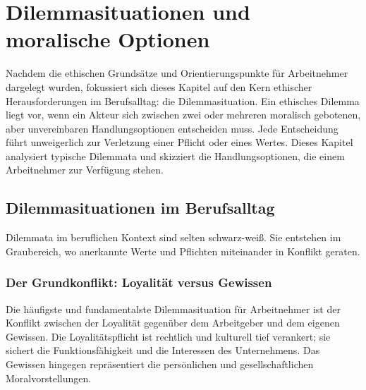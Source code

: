 \documentclass[
    12pt,               %
    a4paper,            %
    ngerman             %
]{scrartcl}
\begin{document}
\section{Dilemmasituationen und moralische Optionen}


 


Nachdem die ethischen Grundsätze und Orientierungspunkte für Arbeitnehmer dargelegt wurden, fokussiert sich dieses Kapitel auf den Kern ethischer Herausforderungen im Berufsalltag: die Dilemmasituation. Ein ethisches Dilemma liegt vor, wenn ein Akteur sich zwischen zwei oder mehreren moralisch gebotenen, aber unvereinbaren Handlungsoptionen entscheiden muss. Jede Entscheidung führt unweigerlich zur Verletzung einer Pflicht oder eines Wertes. Dieses Kapitel analysiert typische Dilemmata und skizziert die Handlungsoptionen, die einem Arbeitnehmer zur Verfügung stehen.

\subsection{Dilemmasituationen im Berufsalltag}
Dilemmata im beruflichen Kontext sind selten schwarz-weiß. Sie entstehen im Graubereich, wo anerkannte Werte und Pflichten miteinander in Konflikt geraten.

\subsubsection*{Der Grundkonflikt: Loyalität versus Gewissen}
Die häufigste und fundamentalste Dilemmasituation für Arbeitnehmer ist der Konflikt zwischen der Loyalität gegenüber dem Arbeitgeber und dem eigenen Gewissen. Die Loyalitätspflicht ist rechtlich und kulturell tief verankert; sie sichert die Funktionsfähigkeit und die Interessen des Unternehmens. Das Gewissen hingegen repräsentiert die persönlichen und gesellschaftlichen Moralvorstellungen.
\end{document}

